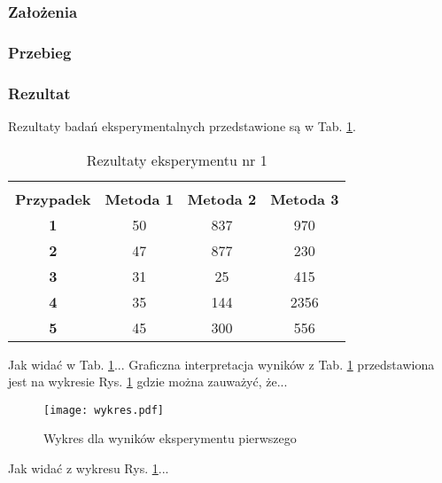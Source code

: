 \documentclass[12pt]{article}
\begin{document}
\subsubsection{Założenia}

\subsubsection{Przebieg}
\newpage

\subsubsection{Rezultat}

Rezultaty badań eksperymentalnych przedstawione są w Tab. \ref{wyniki eksperymentu pierwszego}.
\begin{table}[h!]
 \caption{Rezultaty eksperymentu nr 1}
 \centering
 \vspace{0.2cm}
 \begin{tabular}{c c c c}
  \hline\hline\\[-0.4cm]
  \textbf{Przypadek} & \textbf{Metoda 1} & \textbf{Metoda 2} & \textbf{Metoda 3}\\[0.1cm]
  \hline
  \textbf{1} & 50 & 837 & 970  \\
  \textbf{2} & 47 & 877 & 230  \\
  \textbf{3} & 31 &  25 & 415  \\
  \textbf{4} & 35 & 144 & 2356 \\
  \textbf{5} & 45 & 300 & 556  \\ [0.1cm]
  \hline
 \end{tabular}
 \label{wyniki eksperymentu pierwszego}
\end{table}

\noindent Jak widać w Tab. \ref{wyniki eksperymentu pierwszego}...\newline
Graficzna interpretacja wyników z Tab. \ref{wyniki eksperymentu pierwszego} 
przedstawiona jest na wykresie Rys. \ref{rysunek do eksperymentu pierwszego} gdzie można zauważyć, że...
\begin{figure}[h!]
 \centering
 \texttt{[image: wykres.pdf]}
 \vspace{-0.3cm}
 \caption{Wykres dla wyników eksperymentu pierwszego}
 \label{rysunek do eksperymentu pierwszego}
\end{figure}

\noindent Jak widać z wykresu Rys. \ref{rysunek do eksperymentu pierwszego}...\newline
\end{document}
